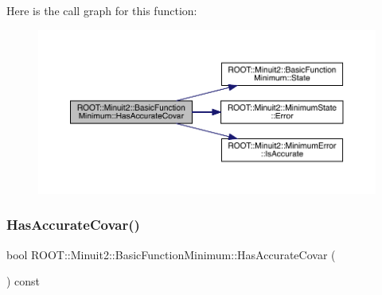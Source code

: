 Here is the call graph for this function\+:
\nopagebreak
\begin{figure}[H]
\begin{center}
\leavevmode
\includegraphics[width=350pt]{de/d25/classROOT_1_1Minuit2_1_1BasicFunctionMinimum_acc1e5d50ec4abe632af93c5dcebd9c0e_cgraph}
\end{center}
\end{figure}
\mbox{\label{classROOT_1_1Minuit2_1_1BasicFunctionMinimum_acc1e5d50ec4abe632af93c5dcebd9c0e}} 
\subsubsection{\texorpdfstring{HasAccurateCovar()}{HasAccurateCovar()}\hspace{0.1cm}{\footnotesize\ttfamily [3/3]}}
{\footnotesize\ttfamily bool R\+O\+O\+T\+::\+Minuit2\+::\+Basic\+Function\+Minimum\+::\+Has\+Accurate\+Covar (\begin{DoxyParamCaption}{ }\end{DoxyParamCaption}) const\hspace{0.3cm}{\ttfamily [inline]}}

